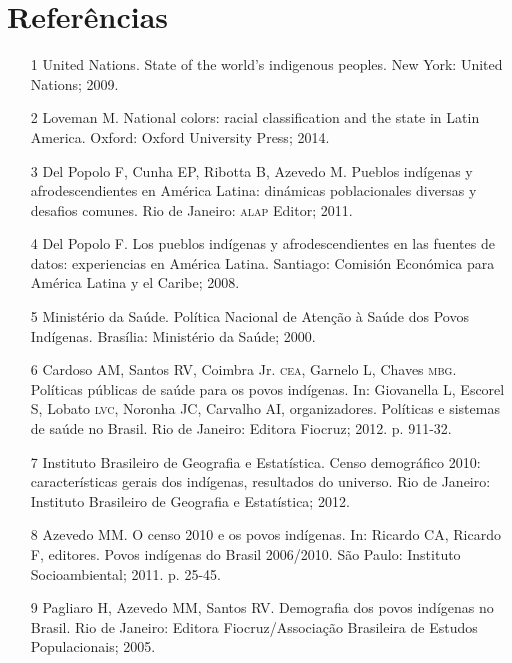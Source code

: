 \documentclass{article}
\begin{document}
\section*{Referências}
\begin{itemize}

\item[1] United Nations. State of the world's indigenous peoples. New York:
United Nations; 2009.

\item[2] Loveman M. National colors: racial classification and the state in
Latin America. Oxford: Oxford University Press; 2014.

\item[3] Del Popolo F, Cunha EP, Ribotta B, Azevedo M. Pueblos indígenas y
afrodescendientes en América Latina: dinámicas poblacionales diversas y desafios
comunes. Rio de Janeiro: \textsc{alap} Editor; 2011.

\item[4] Del Popolo F. Los pueblos indígenas y afrodescendientes en las
fuentes de datos: experiencias en América Latina. Santiago: Comisión Económica
para América Latina y el Caribe; 2008.

\item[5] Ministério da Saúde. Política Nacional de Atenção à Saúde dos Povos
Indígenas. Brasília: Ministério da Saúde; 2000.

\item[6] Cardoso AM, Santos RV, Coimbra Jr. \textsc{cea}, Garnelo L, Chaves \textsc{mbg}.
Políticas públicas de saúde para os povos indígenas. In: Giovanella L, Escorel
S, Lobato \textsc{lvc}, Noronha JC, Carvalho AI, organizadores. Políticas e sistemas de
saúde no Brasil. Rio de Janeiro: Editora Fiocruz; 2012. p. 911-32.

\item[7] Instituto Brasileiro de Geografia e Estatística. Censo demográfico
2010: características gerais dos indígenas, resultados do universo. Rio de
Janeiro: Instituto Brasileiro de Geografia e Estatística; 2012.

\item[8] Azevedo MM. O censo 2010 e os povos indígenas. In: Ricardo CA,
Ricardo F, editores. Povos indígenas do Brasil 2006/2010. São Paulo: Instituto
Socioambiental; 2011. p. 25-45.

\item[9] Pagliaro H, Azevedo MM, Santos RV. Demografia dos povos indígenas no
Brasil. Rio de Janeiro: Editora Fiocruz/Associação Brasileira de Estudos
Populacionais; 2005.


\end{itemize}
\end{document}
